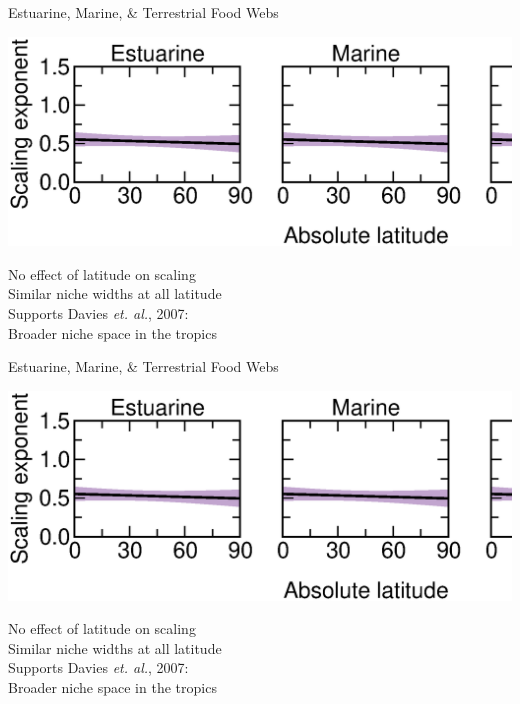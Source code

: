 \documentclass{beamer}
\begin{document}
  \begin{frame}{Estuarine, Marine, \& Terrestrial Food Webs}
    \begin{center}
      \includegraphics*[width=.9\textwidth]{Figures/results/no_effect.eps}

      \vspace{1cm}
      No effect of latitude on scaling\\
      {\color{white}Similar niche widths at all latitude\\
      \vspace{.54cm}      
      Supports Davies \emph{et. al.}, 2007:\\
      Broader niche space in the tropics}

    \end{center}
  \end{frame}


  \begin{frame}{Estuarine, Marine, \& Terrestrial Food Webs}
    \begin{center}
      \includegraphics*[width=.9\textwidth]{Figures/results/no_effect.eps}

      \vspace{1cm}
      No effect of latitude on scaling\\
      Similar niche widths at all latitude\\
      \vspace{.54cm}
      {\color{white} Supports Davies \emph{et. al.}, 2007:\\
      Broader niche space in the tropics}

    \end{center}
  \end{frame}
\end{document}
